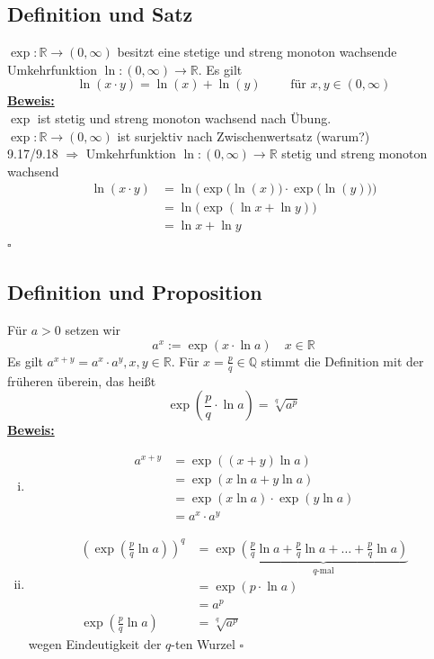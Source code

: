 \subsection{Definition und Satz} %
\label{sub:definition_und_satz}
$\exp : \mathds{R} \to (0, \infty)$ besitzt eine stetige und streng monoton wachsende Umkehrfunktion $\ln : (0, \infty) \to \mathds{R}$. Es gilt 
\[
	\ln (x \cdot y) = \ln (x) + \ln (y) \qquad \text{ für } x,y \in (0, \infty)
\]
\underline{\textbf{Beweis:}} \\
$\exp$ ist stetig und streng monoton wachsend nach Übung. \\
$\exp : \mathds{R} \to (0, \infty)$ ist surjektiv nach Zwischenwertsatz (warum?)
\vspace{10pt} \\
9.17/9.18 $\Rightarrow $ Umkehrfunktion $\ln : (0, \infty) \to \mathds{R}$ stetig und streng monoton wachsend
\begin{align*}
	\ln (x \cdot y) &= \ln \Big( \exp \big(\ln (x) \big)  \cdot \exp \big(\ln (y) \big) \Big) \\
	&= \ln \big(\exp (\ln x + \ln y) \big) \\
	&= \ln x + \ln y
\end{align*}
\hfill \( \square \)

\subsection{Definition und Proposition} %
\label{sub:definition_und_proposition}
Für $a >0$ setzen wir
\[
	a^x := \exp (x \cdot  \ln a) \quad x \in \mathds{R}
\]
Es gilt $a^{x+y}= a^x \cdot a^y , x,y \in \mathds{R}$. Für $x=\frac{p}{q} \in \mathds{Q}$ stimmt die Definition mit der früheren überein, das heißt
\[
	\exp \left(\frac{p}{q} \cdot \ln a \right) = \sqrt[q]{a^p}
\]
\underline{\textbf{Beweis:}} \\
\begin{enumerate}[(i)]
	\item 
	\begin{align*}
		a^{x+y} &= \exp ((x+y) \ln a) \\
		&= \exp (x \ln a + y \ln a) \\
		&= \exp (x \ln a) \cdot \exp (y \ln a) \\
		&= a^x \cdot a^y
	\end{align*}
	\item 
	\begin{align*}
		\left(\exp \left(\frac{p}{q} \ln a \right)\right)^q &= \exp \underbrace{\left(\frac{p}{q} \ln a + 
				\frac{p}{q} \ln a + \ldots + \frac{p}{q} \ln a \right)}_{\text{$q$-mal}} \\
		&= \exp (p \cdot \ln a) \\
		&= a^p \\
		\exp \left(\frac{p}{q} \ln a \right) &= \sqrt[q]{a^p}
	\end{align*}
	wegen Eindeutigkeit der $q$-ten Wurzel \hfill \( \square \)
\end{enumerate}

